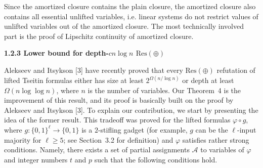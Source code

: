 \documentclass[10pt,a4paper]{article}
\begin{document}
Since the amortized closure contains the plain closure, the amortized closure also contains all essential unlifted variables, i.e.
linear systems do not restrict values of unlifted variables out of the amortized closure. The most technically involved part is the proof of Lipschitz continuity of amortized closure.\par


\par\medskip\noindent\textbf{
1.2.3 Lower bound for depth-$cn\log n$ $\mathrm{Res}(\oplus)$
}\par


Alekseev and Itsykson [3] have recently proved that every $\mathrm{Res}(\oplus)$ refutation of lifted Tseitin formulas either has size at least $2^{\Omega(n/\log n)}$ or depth at least $\Omega(n\log\log n)$, where $n$ is the number of variables. Our Theorem 4 is the improvement of this result, and its proof is basically built on the proof by Alekseev and Itsykson [3]. To explain our contribution, we start by presenting the idea of the former result.
This tradeoff was proved for the lifted formulas $\varphi\circ g$, where $g:\{0,1\}^{\ell}\to\{0,1\}$ is a $2$-stifling gadget (for example, $g$ can be the $\ell$-input majority for $\ell\geq 5$; see Section 3.2 for definition) and $\varphi$ satisfies rather strong conditions. Namely, there exists a set of partial assignments $\mathcal{A}$ to variables of $\varphi$ and integer numbers $t$ and $p$ such that the following conditions hold.\par
\end{document}
